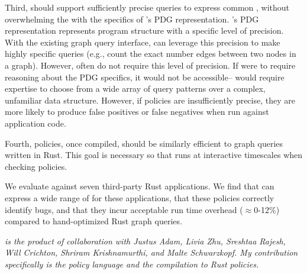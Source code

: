 Third, \syslang{} should support sufficiently precise queries to express common \policies{}, 
without overwhelming the \writer{} with the specifics of \sys{}'s PDG representation. 
%
\sys{}'s PDG representation represents program structure with a specific level of precision.
%
With the existing graph query interface, \writers{} can leverage this precision to make highly specific queries
(e.g., count the exact number edges between two nodes in a graph). 
%
However, \policies{} often do not require this level of precision.
%
If \syslang{} were to require reasoning about the PDG specifics, 
it would not be accessible--\ces{} would require expertise
to choose from a wide array of query patterns over a complex, unfamiliar data structure.
%
However, if policies are insufficiently precise, they are more likely to produce false positives or false negatives when run against application code.

Fourth, \syslang{} policies, once compiled, should be similarly efficient to graph queries written in Rust.
%
This goal is necessary so that \sys{} runs at interactive timescales when checking \syslang{} policies.

We evaluate \syslang{} against seven third-party Rust applications.
%
We find that \syslang{} can express a wide range of \policies{} for these applications,
that these policies correctly identify bugs,
and that they incur acceptable run time overhead ($\approx$0-12\%) compared to hand-optimized Rust graph queries.

\bigskip{}
\emph{\sys{} is the product of collaboration with Justus Adam, Livia Zhu, Sreshtaa Rajesh, 
Will Crichton, Shriram Krishnamurthi, and Malte Schwarzkopf.
My contribution specifically is the \syslang{} policy language and the compilation to Rust policies.}
